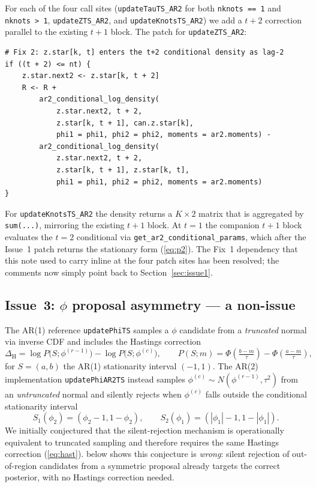 \documentclass[11pt]{article}
\newcommand{\eref}[1]{(\ref{#1})}
\newcommand{\sref}[1]{Section~\ref{#1}}
\theoremstyle{plain}
\theoremstyle{definition}
\theoremstyle{remark}
\begin{document}
For each of the four call sites
(\texttt{updateTauTS\_AR2} for both \texttt{nknots == 1} and
\texttt{nknots > 1}, \texttt{updateZTS\_AR2}, and
\texttt{updateKnotsTS\_AR2}) we add a $t+2$ correction parallel to the
existing $t+1$ block. The patch for \texttt{updateZTS\_AR2}:
\begin{lstlisting}
# Fix 2: z.star[k, t] enters the t+2 conditional density as lag-2
if ((t + 2) <= nt) {
    z.star.next2 <- z.star[k, t + 2]
    R <- R +
        ar2_conditional_log_density(
            z.star.next2, t + 2,
            z.star[k, t + 1], can.z.star[k],
            phi1 = phi1, phi2 = phi2, moments = ar2.moments) -
        ar2_conditional_log_density(
            z.star.next2, t + 2,
            z.star[k, t + 1], z.star[k, t],
            phi1 = phi1, phi2 = phi2, moments = ar2.moments)
}
\end{lstlisting}
For \texttt{updateKnotsTS\_AR2} the density returns a $K \times 2$ matrix
that is aggregated by \texttt{sum(...)}, mirroring the existing $t+1$
block. At $t = 1$ the companion $t+1$ block evaluates the $t = 2$
conditional via \texttt{get\_ar2\_conditional\_params}, which after the
Issue~1 patch returns the stationary form \eref{eq:p2}. The Fix~1 dependency
that this note used to carry inline at the four patch sites has been
resolved; the comments now simply point back to \sref{sec:issue1}.

\subsection{Issue~3: \texorpdfstring{$\phi$}{phi} proposal asymmetry --- a non-issue}\label{sec:issue3}

The AR(1) reference \texttt{updatePhiTS} samples a $\phi$ candidate from a
\emph{truncated} normal via inverse CDF and includes the Hastings
correction
\begin{equation}\label{eq:hast}
  \Delta_{\mathrm{H}} = \log P\!\bigl(S; \phi^{(r-1)}\bigr) - \log P\!\bigl(S; \phi^{(c)}\bigr),
  \qquad P(S; m) = \Phi\!\left(\tfrac{b - m}{\tau}\right) - \Phi\!\left(\tfrac{a - m}{\tau}\right),
\end{equation}
for $S = (a, b)$ the AR(1) stationarity interval $(-1, 1)$.
The AR(2) implementation \texttt{updatePhiAR2TS} instead samples
$\phi^{(c)} \sim N(\phi^{(r-1)}, \tau^2)$ from an \emph{untruncated} normal
and silently rejects when $\phi^{(c)}$ falls outside the conditional
stationarity interval
\begin{equation}\label{eq:S1S2}
  S_1(\phi_2) = (\phi_2 - 1, 1 - \phi_2), \qquad
  S_2(\phi_1) = (|\phi_1| - 1, 1 - |\phi_1|).
\end{equation}
We initially conjectured that the silent-rejection mechanism is
operationally equivalent to truncated sampling and therefore requires the
same Hastings correction \eref{eq:hast}.  below shows
this conjecture is \emph{wrong}: silent rejection of out-of-region
candidates from a symmetric proposal already targets the correct
posterior, with no Hastings correction needed.
\end{document}
